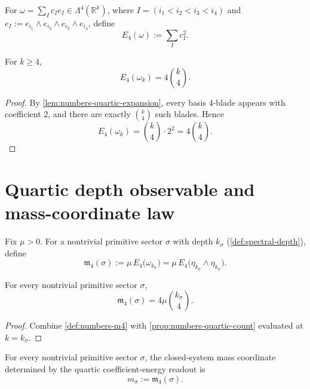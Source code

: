 \begin{definition}
\label{def:numbers-quartic-energy}
For
\(\omega=\sum_I c_I e_I\in\Lambda^4(\mathbb R^k)\), where
\(I=(i_1<i_2<i_3<i_4)\) and
\(e_I:=e_{i_1}\wedge e_{i_2}\wedge e_{i_3}\wedge e_{i_4}\), define
\[
  E_4(\omega):=\sum_I c_I^2.
\]
\end{definition}

\begin{proposition}
\label{prop:numbers-quartic-count}
For \(k\ge 4\),
\[
  E_4(\omega_k)=4\binom{k}{4}.
\]
\end{proposition}

\begin{proof}
By \cref{lem:numbers-quartic-expansion}, every basis \(4\)-blade appears
with coefficient \(2\), and there are exactly \(\binom{k}{4}\) such blades.
Hence
\[
  E_4(\omega_k)
  =
  \binom{k}{4}\cdot 2^2
  =
  4\binom{k}{4}.
\]
\end{proof}

\section{Quartic depth observable and mass-coordinate law}
\label{sec:numbers-mass-law}

\begin{definition}
\label{def:numbers-m4}
Fix \(\mu>0\).
For a nontrivial primitive sector \(\sigma\) with depth \(k_\sigma\)
(\cref{def:spectral-depth}), define
\[
  \mathfrak m_4(\sigma)
  :=
  \mu\,E_4\!\bigl(\omega_{k_\sigma}\bigr)
  =
  \mu\,E_4\!\bigl(\eta_{k_\sigma}\wedge\eta_{k_\sigma}\bigr).
\]
\end{definition}

\begin{theorem}
\label{thm:numbers-quartic-formula}
For every nontrivial primitive sector \(\sigma\),
\[
  \mathfrak m_4(\sigma)=4\mu\binom{k_\sigma}{4}.
\]
\end{theorem}

\begin{proof}
Combine \cref{def:numbers-m4} with
\cref{prop:numbers-quartic-count} evaluated at \(k=k_\sigma\).
\end{proof}

\begin{theorem}
\label{thm:numbers-mass-calibration}
For every nontrivial primitive sector \(\sigma\), the closed-system
mass coordinate determined by the quartic coefficient-energy readout is
\[
  m_\sigma:=\mathfrak m_4(\sigma).
\]
\end{theorem}

